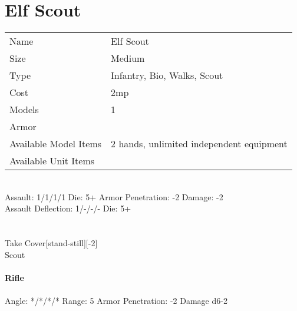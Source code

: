 \pagebreak

\section{ Elf Scout }

\begin{tabular}{ll}
  Name & Elf Scout \\
  Size & Medium\\
  Type & Infantry, Bio, Walks, Scout\\
  Cost & 2mp\\
  Models & 1\\
  Armor & \\
  Available Model Items & 2 hands, unlimited independent equipment \\
  Available Unit Items &  \\
\end{tabular}

\ \\
Assault: 1/1/1/1 Die: 5+ Armor Penetration: -2 Damage: -2 \\
Assault Deflection: 1/-/-/- Die: 5+\\
\indent  \\
\ \\
Take Cover[stand-still][-2] \\ Scout
\ \\
\ \\
{\bf Rifle } \\
\ \\
Angle: */*/*/* Range: 5 Armor Penetration: -2 Damage d6-2 \\
\indent  \\





